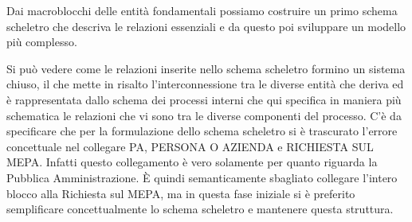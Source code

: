 Dai macroblocchi delle entità fondamentali possiamo costruire un primo schema scheletro che descriva le relazioni essenziali e da questo poi sviluppare un modello più complesso.\newline



\noindent{}
\newline\newline
Si può vedere come le relazioni inserite nello schema scheletro formino un sistema chiuso, il che mette in risalto l'interconnessione tra le diverse entità che deriva ed è rappresentata dallo schema dei processi interni che qui specifica in maniera più schematica le relazioni che vi sono tra le diverse componenti del processo.
\newline
C'è da specificare che per la formulazione dello schema scheletro si è trascurato l'errore concettuale nel collegare PA, PERSONA O AZIENDA e RICHIESTA SUL MEPA. Infatti questo collegamento è vero solamente per quanto riguarda la Pubblica Amministrazione. È quindi semanticamente sbagliato collegare l'intero blocco alla Richiesta sul MEPA, ma in questa fase iniziale si è preferito semplificare concettualmente lo schema scheletro e mantenere questa struttura.
